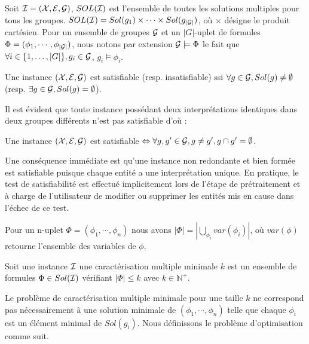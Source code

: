 Soit ${\cal I} = ({\cal X}, {\cal E}, {\cal G})$, $ SOL({\cal I})$ est
l'ensemble de toutes les solutions multiples pour tous les groupes. $SOL({\cal
I})=Sol(g_1) \times \cdots \times Sol(g_{|{\cal G}|})$, où $\times$ désigne le produit cartésien. Pour un ensemble de
groupes ${\cal G}$ et un $|G|$-uplet de formules $\Phi=(\phi_1,\cdots,\phi_{|{\cal G}|})$, nous notons par extension ${\cal G} \models \Phi$ le fait que
$\forall i\in \{1,\ldots,|G|\}, g_i \in {\cal G}$, $g_i \models \phi_i$.

\begin{definition}
Une instance $({\cal X}, {\cal E}, {\cal G})$ est satisfiable (resp. insatisfiable) ssi
$\forall g \in {\cal G}, Sol(g) \neq \emptyset$ (resp. $\exists g \in {\cal G},
Sol(g) = \emptyset$).
\end{definition}

Il est évident que toute instance possédant deux interprétations identiques dans deux groupes différents n'est pas satisfiable d'où :

\begin{proposition}
Une instance $({\cal X},{\cal E},{\cal G})$ est satisfiable $\Leftrightarrow
\forall g,g' \in {\cal G}, g\neq g', g
\cap g' =\emptyset$.
\end{proposition}

Une conséquence immédiate est qu'une instance non redondante et bien formée
est satisfiable puisque chaque entité a une interprétation unique.
En pratique, le test de satisfiabilité est effectué implicitement lors de
l'étape de prétraitement et à charge de l'utilisateur de modifier ou supprimer
les entités mis en cause dans l'échec de ce test.

\begin{definition}
\label{Flength}
Pour un n-uplet $\Phi=(\phi_1,\cdots,\phi_n)$ nous avons $|\Phi| =
|\bigcup_{\phi_i} var(\phi_{i})|$, où $var({\phi})$ retourne l'ensemble des
variables de
$\phi$.
\end{definition}

\begin{definition}
Soit une instance ${\cal I}$ une
caractérisation multiple minimale $k$ est un ensemble de formules
$\Phi \in Sol({\cal I})$ vérifiant $|\Phi| \leq k$ avec $ k\in \mathbb{N}^{+}$.
\end{definition}

Le problème de caractérisation multiple minimale pour une taille $k$ ne
correspond pas nécessairement à une solution minimale de
$(\phi_1,\cdots,\phi_n)$ telle que chaque $\phi_i$ est un élément minimal de
$Sol(g_i)$. Nous définissons le problème d'optimisation comme suit.

